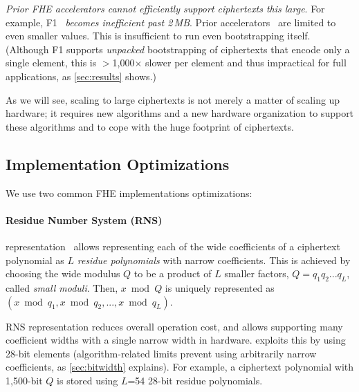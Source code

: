 \figBootstrappingFrequency

\emph{Prior FHE accelerators cannot efficiently support ciphertexts this large}.
For example, F1~\cite{feldmann:micro21:f1} \emph{becomes inefficient past 2\,MB}.
Prior accelerators~\cite{riazi:asplos20:heax} are limited to even smaller values.
This is insufficient to run even bootstrapping itself.
(Although F1 supports \emph{unpacked} bootstrapping of ciphertexts that encode
only a single element, this is $>$1,000$\times$ slower per element and thus impractical for
full applications, as \autoref{sec:results} shows.)

As we will see, scaling to large ciphertexts is not merely a matter of scaling up hardware;
it requires new algorithms and a new hardware organization to support these algorithms
and to cope with the huge footprint of ciphertexts.

\subsection{Implementation Optimizations}
\label{sec:rns}
\label{sec:ntt}

We use two common FHE implementations optimizations:

\paragraph{Residue Number System (RNS)} representation~\cite{garner:1959:residue}
allows representing each of the wide coefficients of a ciphertext polynomial as $L$ \emph{residue polynomials}
with narrow coefficients. This is achieved by choosing the wide modulus $Q$ to be a product of $L$ smaller factors, $Q = q_1q_2...q_L$, called \emph{small moduli}.
Then, $x \bmod Q$ is uniquely represented as $(x \bmod q_1, x \bmod q_2, ..., x \bmod q_L)$.

RNS representation 
reduces overall operation cost, and allows supporting many coefficient widths with a single narrow width in hardware.
\name exploits this by using 28-bit elements
(algorithm-related limits prevent using arbitrarily narrow coefficients, as \autoref{sec:bitwidth} explains).
For example, a ciphertext polynomial with 1,500-bit $Q$ is stored using $L$=54 28-bit residue polynomials.

